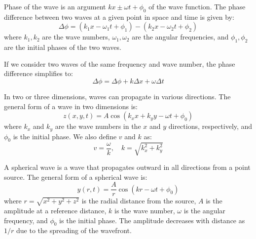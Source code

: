 \documentclass[11pt]{report}
\begin{document}
\begin{definition}
    Phase of the wave is an argument $kx \pm \omega t + \phi_0$ of the wave function. The phase difference between two waves at a given point in space and time is given by:
    \begin{equation}
        \Delta \phi = (k_1 x - \omega_1 t + \phi_1) - (k_2 x - \omega_2 t + \phi_2)
    \end{equation}
    where \( k_1, k_2 \) are the wave numbers, \( \omega_1, \omega_2 \) are the angular frequencies, and \( \phi_1, \phi_2 \) are the initial phases of the two waves.

    If we consider two waves of the same frequency and wave number, the phase difference simplifies to:
    \begin{equation}
        \Delta \phi = \Delta\phi + k\Delta x + \omega \Delta t
    \end{equation}

\end{definition}
\begin{definition}
    In two or three dimensions, waves can propagate in various directions. The general form of a wave in two dimensions is:
    \begin{equation}
        z(x,y,t) = A \cos(k_x x + k_y y - \omega t + \phi_0)
    \end{equation}
    where \( k_x \) and \( k_y \) are the wave numbers in the \( x \) and \( y \) directions, respectively, and \( \phi_0 \) is the initial phase. We also define $v$ and $k$ as:
    \begin{equation}
        v = \frac{\omega}{k}, \quad k = \sqrt{k_x^2 + k_y^2}
    \end{equation}
\end{definition}

\begin{definition}
    A spherical wave is a wave that propagates outward in all directions from a point source. The general form of a spherical wave is:
    \begin{equation}
        y(r,t) = \frac{A}{r} \cos(kr - \omega t + \phi_0)
    \end{equation}
    where \( r = \sqrt{x^2 + y^2 + z^2} \) is the radial distance from the source, \( A \) is the amplitude at a reference distance, \( k \) is the wave number, \( \omega \) is the angular frequency, and \( \phi_0 \) is the initial phase. The amplitude decreases with distance as \( 1/r \) due to the spreading of the wavefront.
    
\end{definition}
\end{document}
